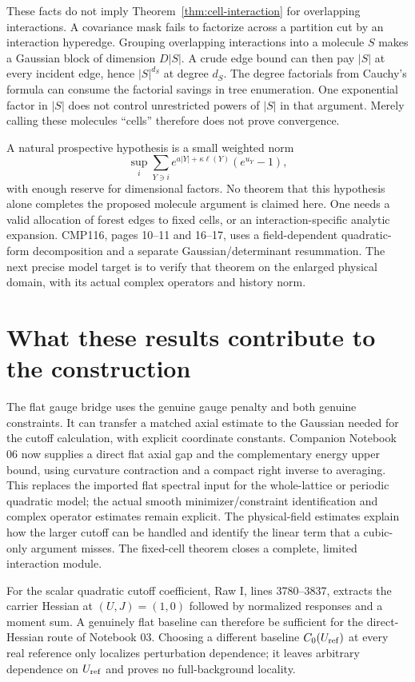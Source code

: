 \documentclass[11pt]{article}
\theoremstyle{remark}
\begin{document}
These facts do not imply Theorem~\ref{thm:cell-interaction} for
overlapping interactions. A covariance mask fails to factorize across
a partition cut by an interaction hyperedge. Grouping overlapping
interactions into a molecule $S$ makes a Gaussian block of dimension
$D|S|$. A crude edge bound can then pay $|S|$ at every incident edge,
hence $|S|^{d_S}$ at degree $d_S$. The degree factorials from Cauchy's
formula can consume the factorial savings in tree enumeration.
One exponential factor in $|S|$ does not control unrestricted powers
of $|S|$ in that argument. Merely calling these molecules ``cells''
therefore does not prove convergence.

A natural prospective hypothesis is a small weighted norm
\[
 \sup_i\sum_{Y\ni i}e^{a|Y|+\kappa\ell(Y)}(e^{u_Y}-1),
\]
with enough reserve for dimensional factors. No theorem that this
hypothesis alone completes the proposed molecule argument is claimed
here. One needs a valid allocation of forest edges to fixed cells,
or an interaction-specific analytic expansion. CMP116, pages 10--11
and 16--17, uses a field-dependent quadratic-form decomposition and
a separate Gaussian/determinant resummation. The next precise model
target is to verify that theorem on the enlarged physical domain,
with its actual complex operators and history norm.

\section{What these results contribute to the construction}

The flat gauge bridge uses the genuine gauge penalty and both genuine
constraints. It can transfer a matched axial estimate to the Gaussian
needed for the cutoff calculation, with explicit coordinate constants.
Companion Notebook 06 now supplies a direct flat axial gap and the
complementary energy upper bound, using curvature contraction and a
compact right inverse to averaging. This replaces the imported flat
spectral input for the whole-lattice or periodic quadratic model;
the actual smooth minimizer/constraint identification and complex
operator estimates remain explicit.
The physical-field estimates explain how the larger cutoff can be
handled and identify the linear term that a cubic-only argument misses.
The fixed-cell theorem closes a complete, limited interaction module.

For the scalar quadratic cutoff coefficient, Raw I, lines 3780--3837,
extracts the carrier Hessian at $(U,J)=(1,0)$ followed by normalized
responses and a moment sum. A genuinely flat baseline can therefore
be sufficient for the direct-Hessian route of Notebook 03. Choosing
a different baseline $C_0(U_{\rm ref})$ at every real reference only
localizes perturbation dependence; it leaves arbitrary dependence on
$U_{\rm ref}$ and proves no full-background locality.
\end{document}
